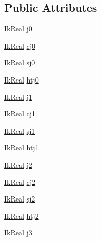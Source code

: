 \subsection*{Public Attributes}
\begin{DoxyCompactItemize}
\item 
\hyperlink{ikfast_8h_ad067e4244010306f633e94db2645dd6d}{Ik\-Real} \hyperlink{classIKSolver_a57f10792b61e342bc910311172b36488}{j0}
\item 
\hyperlink{ikfast_8h_ad067e4244010306f633e94db2645dd6d}{Ik\-Real} \hyperlink{classIKSolver_aa3c0bd74bcf87573ce608d8039408526}{cj0}
\item 
\hyperlink{ikfast_8h_ad067e4244010306f633e94db2645dd6d}{Ik\-Real} \hyperlink{classIKSolver_a791e2437d1fc1b568b213b0388f97d0a}{sj0}
\item 
\hyperlink{ikfast_8h_ad067e4244010306f633e94db2645dd6d}{Ik\-Real} \hyperlink{classIKSolver_af29aefe604a6957a573f5532a0ae0924}{htj0}
\item 
\hyperlink{ikfast_8h_ad067e4244010306f633e94db2645dd6d}{Ik\-Real} \hyperlink{classIKSolver_abce606fc49166277524525eadfe47f1a}{j1}
\item 
\hyperlink{ikfast_8h_ad067e4244010306f633e94db2645dd6d}{Ik\-Real} \hyperlink{classIKSolver_a2eff4800151517f5c649cb948bad8326}{cj1}
\item 
\hyperlink{ikfast_8h_ad067e4244010306f633e94db2645dd6d}{Ik\-Real} \hyperlink{classIKSolver_a0d7c3270795003a7947ae93ba90b8335}{sj1}
\item 
\hyperlink{ikfast_8h_ad067e4244010306f633e94db2645dd6d}{Ik\-Real} \hyperlink{classIKSolver_aa12be6bab85a8ca6c8c74c0cb5e92cf9}{htj1}
\item 
\hyperlink{ikfast_8h_ad067e4244010306f633e94db2645dd6d}{Ik\-Real} \hyperlink{classIKSolver_a2059d93255027d204610a6818e5c45a6}{j2}
\item 
\hyperlink{ikfast_8h_ad067e4244010306f633e94db2645dd6d}{Ik\-Real} \hyperlink{classIKSolver_afae239eeaad5f0c027cd4837faa666a0}{cj2}
\item 
\hyperlink{ikfast_8h_ad067e4244010306f633e94db2645dd6d}{Ik\-Real} \hyperlink{classIKSolver_adbd68395fd872d5e9a13f3a787c1b0d9}{sj2}
\item 
\hyperlink{ikfast_8h_ad067e4244010306f633e94db2645dd6d}{Ik\-Real} \hyperlink{classIKSolver_a33e07730a03291ee56912b371dc8268f}{htj2}
\item 
\hyperlink{ikfast_8h_ad067e4244010306f633e94db2645dd6d}{Ik\-Real} \hyperlink{classIKSolver_adf5d1568dc258d51edc6430bf90ef09d}{j3}
\item 

\end{DoxyCompactItemize}
